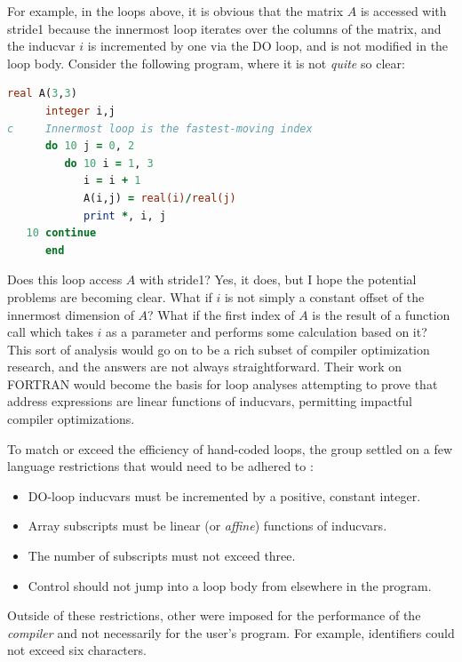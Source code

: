 For example, in the loops above, it is obvious that the matrix $A$ is accessed
with \gls{stride1} because the innermost loop iterates over the columns of the
matrix, and the \gls{inducvar} $i$ is incremented by one via the DO loop,
and is not modified in the loop body.
Consider the following program, where it is not \textit{quite} so clear:

\begin{lstlisting}[language=fortran,frame=single]
      real A(3,3)
      integer i,j
c     Innermost loop is the fastest-moving index
      do 10 j = 0, 2
         do 10 i = 1, 3
            i = i + 1
            A(i,j) = real(i)/real(j)
            print *, i, j
   10 continue
      end
\end{lstlisting}

Does this loop access $A$ with \gls{stride1}?
Yes, it does, but I hope the potential problems are becoming clear.
What if $i$ is not simply a constant offset of the innermost dimension of $A$?
What if the first index of $A$ is the result of a function call which takes $i$
as a parameter and performs some calculation based on it?
This sort of analysis would go on to be a rich subset of compiler optimization research,
and the answers are not always straightforward.
Their work on FORTRAN would become the basis for loop analyses attempting to prove
that address expressions are linear functions of \gls{inducvar}s,
permitting impactful compiler optimizations.

To match or exceed the efficiency of hand-coded loops, the group settled on a few
language restrictions that would need to be adhered to
\cite{backus_heising_fortran_1964}:

\begin{itemize}
	\item DO-loop \gls{inducvar}s must be incremented by a positive, constant integer.
	\item Array subscripts must be linear (or \textit{affine}) functions of \gls{inducvar}s.
	\item The number of subscripts must not exceed three.
	\item Control should not jump into a loop body from elsewhere in the program.
\end{itemize}

Outside of these restrictions, other were imposed for the performance of the \textit{compiler}
and not necessarily for the user's program. For example, identifiers could not
exceed six characters.
